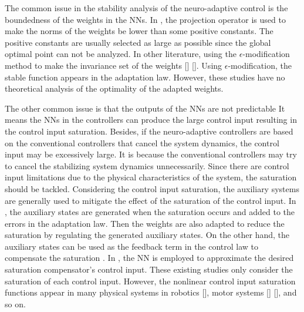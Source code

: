 \documentclass[lettersize,journal]{IEEEtran}
\begin{document}
The common issue in the stability analysis of the neuro-adaptive control is the boundedness of the weights in the NNs.
In \cite{RN16, RN14, RN11}, the projection operator is used to make the norms of the weights be lower than some positive constants.
The positive constants are usually selected as large as possible since the global optimal point can not be analyzed.
\color{red}
In other literature, using the $\epsilon$-modification method to make the invariance set of the weights [] [].
\color{black}
Using $\epsilon$-modification, the stable function appears in the adaptation law. %
However, these studies have no theoretical analysis of the optimality of the adapted weights.

The other common issue is that the outputs of the NNs are not predictable
It means the NNs in the controllers can produce the large control input resulting in the control input saturation.
Besides, if the neuro-adaptive controllers are based on the conventional controllers that cancel the system dynamics, the control input may be excessively large.
It is because the conventional controllers may try to cancel the stabilizing system dynamics unnecessarily.
Since there are control input limitations due to the physical characteristics of the system, the saturation should be tackled.
Considering the control input saturation, the auxiliary systems are generally used to mitigate the effect of the saturation of the control input.
In \cite{RN55, RN56, RN54, RN3}, the auxiliary states are generated when the saturation occurs and added to the errors in the adaptation law.
Then the weights are also adapted to reduce the saturation by regulating the generated auxiliary states.
On the other hand,
the auxiliary states can be used as the feedback term in the control law to compensate the saturation \cite{RN34, RN38, RN37, RN36}.
In \cite{RN41}, the NN is employed to approximate the desired saturation compensator's control input.
These existing studies only consider the saturation of each control input.
\color{red} However, the nonlinear control input saturation functions appear in many physical systems in robotics [], motor systems [] [], and so on. \color{black}
\end{document}
